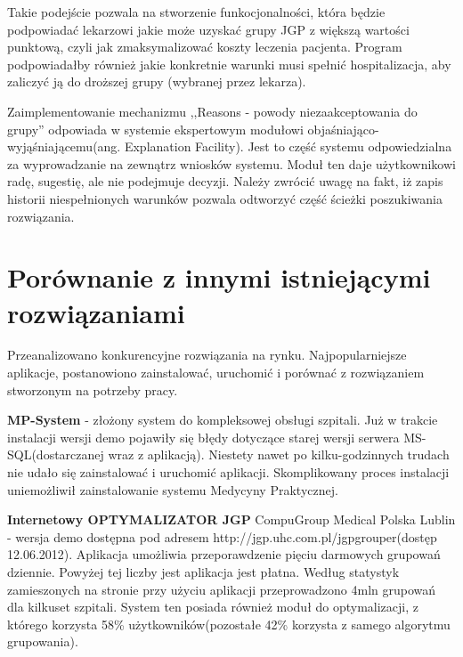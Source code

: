 Takie podejście pozwala na stworzenie funkocjonalności, która będzie podpowiadać lekarzowi jakie może uzyskać grupy JGP z większą wartości punktową, czyli jak zmaksymalizować koszty leczenia pacjenta. Program podpowiadałby również jakie konkretnie warunki musi spełnić hospitalizacja, aby zaliczyć ją do droższej grupy (wybranej przez lekarza).

Zaimplementowanie mechanizmu ,,Reasons - powody niezaakceptowania do grupy'' odpowiada w systemie ekspertowym modułowi objaśniająco-wyjąśniającemu(ang. Explanation Facility). Jest to część systemu odpowiedzialna za wyprowadzanie na zewnątrz wniosków systemu. Moduł ten daje użytkownikowi radę, sugestię, ale nie podejmuje decyzji\cite{martyniuk_ekspertowe}. Należy zwrócić uwagę na fakt, iż zapis historii niespełnionych warunków pozwala odtworzyć część ścieżki poszukiwania rozwiązania.


\section{Porównanie z innymi istniejącymi rozwiązaniami}
\label{sec:porownanieZinnymiRozwiazaniami}

Przeanalizowano konkurencyjne rozwiązania na rynku. Najpopularniejsze aplikacje, postanowiono zainstalować, uruchomić i porównać z rozwiązaniem stworzonym na potrzeby pracy. %

\textbf{MP-System} - złożony system do kompleksowej obsługi szpitali. Już w trakcie instalacji wersji demo pojawiły się błędy dotyczące starej wersji serwera MS-SQL(dostarczanej wraz z aplikacją). Niestety nawet po kilku-godzinnych trudach nie udało się zainstalować i uruchomić aplikacji. Skomplikowany proces instalacji uniemożliwił zainstalowanie systemu Medycyny Praktycznej.

\textbf{Internetowy OPTYMALIZATOR JGP} CompuGroup Medical Polska Lublin - wersja demo dostępna pod adresem http://jgp.uhc.com.pl/jgpgrouper(dostęp 12.06.2012).
Aplikacja umożliwia przeporawdzenie pięciu darmowych grupowań dziennie. Powyżej tej liczby jest aplikacja jest płatna. Według statystyk zamieszonych na stronie przy użyciu aplikacji przeprowadzono 4mln grupowań dla kilkuset szpitali.%
System ten posiada również moduł do optymalizacji, z którego korzysta 58\% użytkowników(pozostałe 42\% korzysta z samego algorytmu grupowania).

